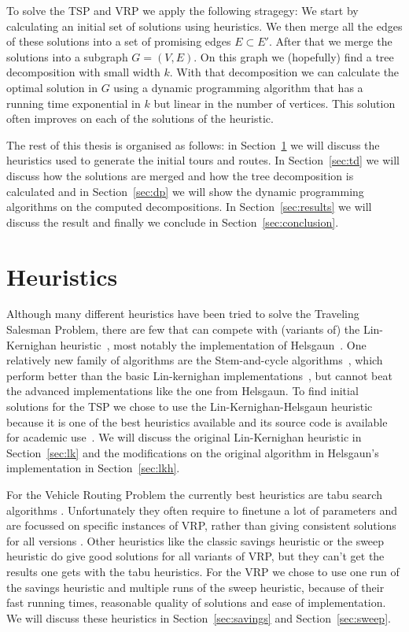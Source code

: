\documentclass[titlepage, 12pt]{article}
\begin{document}
To solve the TSP and VRP we apply the following stragegy: We start by calculating an initial set of
solutions using heuristics. We then merge all the edges of these solutions into a set of promising
edges $E \subset E'$. After that we merge the solutions into a subgraph $G = (V, E)$. On this graph
we (hopefully) find a tree decomposition with small width $k$. With that decomposition we can
calculate the optimal solution in $G$ using a dynamic programming algorithm that has a running time
exponential in $k$ but linear in the number of vertices. This solution often improves on each of the
solutions of the heuristic.

The rest of this thesis is organised as follows: in Section~\ref{sec:heuristics} we will discuss the
heuristics used to generate the initial tours and routes. In Section~\ref{sec:td} we will discuss how
the solutions are merged and how the tree decomposition is calculated and in Section~\ref{sec:dp} we will
show the dynamic programming algorithms on the computed decompositions. In Section~\ref{sec:results}
we will discuss the result and finally we conclude in Section~\ref{sec:conclusion}.



%
%
\section{Heuristics}
\label{sec:heuristics}
Although many different heuristics have been tried to solve the Traveling Salesman Problem, there
are few that can compete with (variants of) the Lin-Kernighan heuristic~\cite{lkh1, vrp-summary-1},
most notably the implementation of Helsgaun~\cite{lkh2}.
One relatively new family of algorithms are the Stem-and-cycle algorithms~\cite{stem-cycle-1,
stem-cycle-2, tsp-summary}, which perform better than the basic Lin-kernighan
implementations~\cite{tsp-summary}, but cannot beat the advanced implementations like the one from
Helsgaun.
To find initial solutions for the TSP we chose to use the Lin-Kernighan-Helsgaun heuristic
because it is one of the best heuristics available and its source code is available for academic
use~\cite{lkh-url}. We will discuss the original Lin-Kernighan heuristic in Section~\ref{sec:lk} and
the modifications on the original algorithm in Helsgaun's implementation in Section~\ref{sec:lkh}.

For the Vehicle Routing Problem the currently best heuristics are tabu search algorithms
\cite{vrp-summary-1, vrp-summary-2}. Unfortunately they often require to finetune a lot of
parameters and are focussed on specific instances of VRP, rather than giving consistent solutions
for all versions \cite{vrp-summary-1}. Other heuristics like the classic savings heuristic or the
sweep heuristic do give good solutions for all variants of VRP, but they can't get the results one
gets with the tabu heuristics.
For the VRP we chose to use one run of the savings heuristic and multiple runs of the sweep
heuristic, because of their fast running times, reasonable quality of solutions and ease of
implementation. We will discuss these heuristics in Section~\ref{sec:savings} and
Section~\ref{sec:sweep}.
\end{document}
